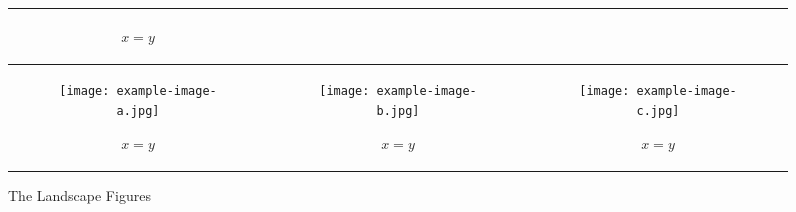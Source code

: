 \begin{landscape}
\begin{figure}[ht]
\begin{tabular}{|c|c|c|}
\begin{subfigure}[b]{0.44\textwidth}
			\caption{$x=y$}
         	\label{fig:ly6}
		\end{subfigure}\\
		\hline
		\begin{subfigure}[b]{0.44\textwidth}
			\centering
			\texttt{[image: example-image-a.jpg]}
			\caption{$x=y$}
         	\label{fig:ly7}
		\end{subfigure} & 
		\begin{subfigure}[b]{0.44\textwidth}
			\centering
			\texttt{[image: example-image-b.jpg]}
			\caption{$x=y$}
         	\label{fig:ly8}
		\end{subfigure} & 
		\begin{subfigure}[b]{0.44\textwidth}
			\centering
			\texttt{[image: example-image-c.jpg]}
			\caption{$x=y$}
         	\label{fig:ly9}
		\end{subfigure}\\
		\hline
	\end{tabular}	      
    \caption{The Landscape Figures}
    \label{fig:my_label_landscape}
\end{figure}

\end{landscape}

\lipsum[1]